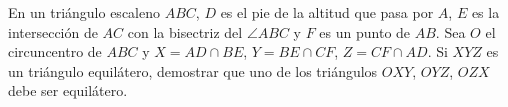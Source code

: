En un triángulo escaleno $ABC$, $D$ es el pie de la altitud que pasa por $A$, $E$ es la intersección de $AC$ con la bisectriz del $\angle ABC$ y $F$ es un punto de $AB$. Sea $O$ el circuncentro de $ABC$ y $X=AD\cap BE$, $Y=BE\cap CF$, $Z=CF \cap AD$. Si $XYZ$ es un triángulo equilátero, demostrar que uno de los triángulos $OXY$, $OYZ$, $OZX$ debe ser equilátero.
